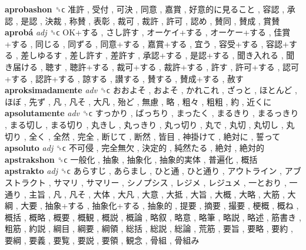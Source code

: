 \textbf{aprobashon} ␝ϲ   准許 ,  受付 ,  可決 ,  同意 ,  嘉賞 ,  好意的に見ること ,  容認 ,  承認 ,  是認 ,  決裁 ,  称賛 ,  表彰 ,  裁可 ,  裁許 ,  許可 ,  認め ,  賛同 ,  賛成 ,  賞賛   \\
\textbf{aprobá} \emph{adj}  ␝ϲ   OK+する ,  さし許す ,  オーケイ+する ,  オーケー+する ,  佳賞+する ,  同じる ,  同ずる ,  同意+する ,  嘉賞+する ,  宜う ,  容受+する ,  容認+する ,  差しゆるす ,  差し許す ,  差許す ,  承認+する ,  是認+する ,  聞き入れる ,  聞き届ける ,  聴す ,  聴許+する ,  裁可+する ,  裁許+する ,  許す ,  許可+する ,  認可+する ,  認許+する ,  諒する ,  讃する ,  賛する ,  賛成+する ,  赦す   \\
\textbf{aproksimadamente} \emph{adv}  ␝ϲ   おおよそ ,  およそ ,  かれこれ ,  ざっと ,  ほとんど ,  ほぼ ,  先ず ,  凡 ,  凡そ ,  大凡 ,  殆ど ,  無慮 ,  略 ,  粗々 ,  粗粗 ,  約 ,  近くに   \\
\textbf{apsolutamente} \emph{adv}  ␝ϲ   すっかり ,  ばっちり ,  まったく ,  まるきり ,  まるっきり ,  まる切し ,  まる切り ,  丸きし ,  丸っきり ,  丸っ切り ,  丸で ,  丸切 ,  丸切し ,  丸切り ,  全く ,  全然 ,  完全 ,  断じて ,  断然 ,  皆目 ,  神掛けて ,  絶対に ,  誓って   \\
\textbf{apsoluto} \emph{adj}  ␝ϲ   不可侵 ,  完全無欠 ,  決定的 ,  純然たる ,  絶対 ,  絶対的   \\
\textbf{apstrakshon} ␝ϲ   一般化 ,  抽象 ,  抽象化 ,  抽象的実体 ,  普遍化 ,  概括   \\
\textbf{apstrakto} \emph{adj}  ␝ϲ   あらすじ ,  あらまし ,  ひと通 ,  ひと通り ,  アウトライン ,  アブストラクト ,  サマリ ,  サマリー ,  シノプシス ,  レジメ ,  レジュメ ,  一とおり ,  一通り ,  主旨 ,  凡 ,  凡そ ,  大体 ,  大凡 ,  大意 ,  大抵 ,  大旨 ,  大概 ,  大略 ,  大筋 ,  大綱 ,  大要 ,  抽象+する ,  抽象化+する ,  抽象的 ,  提要 ,  摘要 ,  撮要 ,  梗概 ,  概ね ,  概括 ,  概略 ,  概要 ,  概観 ,  概説 ,  概論 ,  略叙 ,  略意 ,  略筆 ,  略説 ,  略述 ,  筋書き ,  粗筋 ,  約説 ,  綱目 ,  綱要 ,  綱領 ,  総括 ,  総説 ,  総論 ,  荒筋 ,  要旨 ,  要略 ,  要約 ,  要綱 ,  要義 ,  要覧 ,  要説 ,  要領 ,  観念 ,  骨組 ,  骨組み   \\
